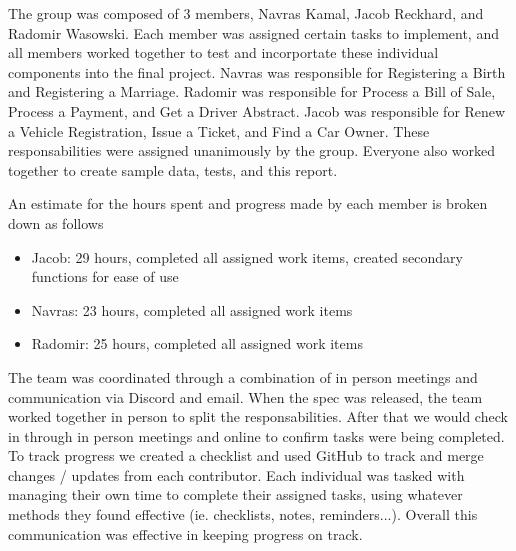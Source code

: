 The group was composed of 3 members, Navras Kamal, Jacob Reckhard, and Radomir Wasowski.  Each member was assigned certain tasks to implement, and all members worked together to test and incorportate these individual components into the final project.  Navras was responsible for Registering a Birth and Registering a Marriage.  Radomir was responsible for Process a Bill of Sale, Process a Payment, and Get a Driver Abstract.  Jacob was responsible for Renew a Vehicle Registration, Issue a Ticket, and Find a Car Owner.  These responsabilities were assigned unanimously by the group.  Everyone also worked together to create sample data, tests, and this report.  

An estimate for the hours spent and progress made by each member is broken down as follows
\begin{itemize}
\item{Jacob: 29 hours, completed all assigned work items, created secondary functions for ease of use}
\item{Navras: 23 hours, completed all assigned work items}
\item{Radomir: 25 hours, completed all assigned work items}
\end{itemize}

The team was coordinated through a combination of in person meetings and communication via Discord and email.  When the spec was released, the team worked together in person to split the responsabilities.  After that we would check in through in person meetings and online to confirm tasks were being completed.  To track progress we created a checklist and used GitHub to track and merge changes / updates from each contributor.  Each individual was tasked with managing their own time to complete their assigned tasks, using whatever methods they found effective (ie. checklists, notes, reminders...).  Overall this communication was effective in keeping progress on track.  
